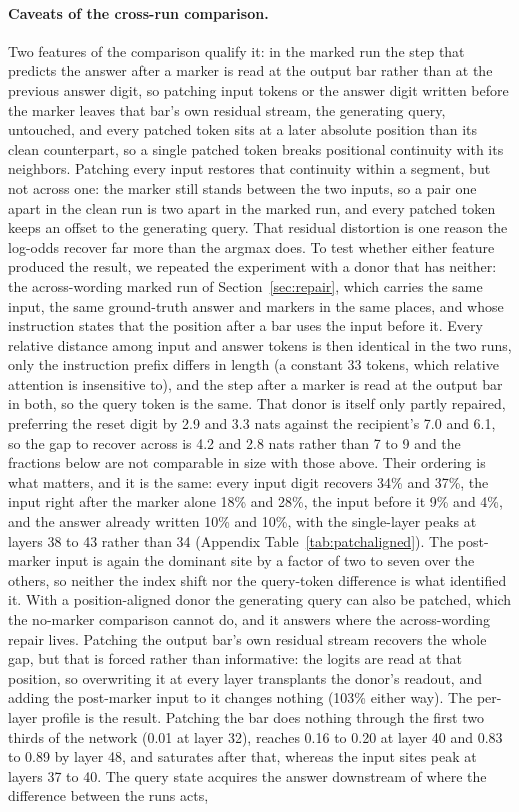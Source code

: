 \documentclass[10pt]{article} %
\begin{document}
\paragraph{Caveats of the cross-run comparison.} Two features of the comparison qualify it: in the marked run the step that predicts the answer after a marker is read at the output bar rather than at the previous answer digit, so patching input tokens or the answer digit written before the marker leaves that bar's own residual stream, the generating query, untouched, and every patched token sits at a later absolute position than its clean counterpart, so a single patched token breaks positional continuity with its neighbors. Patching every input restores that continuity within a segment, but not across one: the marker still stands between the two inputs, so a pair one apart in the clean run is two apart in the marked run, and every patched token keeps an offset to the generating query. That residual distortion is one reason the log-odds recover far more than the argmax does. To test whether either feature produced the result, we repeated the experiment with a donor that has neither: the across-wording marked run of Section~\ref{sec:repair}, which carries the same input, the same ground-truth answer and markers in the same places, and whose instruction states that the position after a bar uses the input before it. Every relative distance among input and answer tokens is then identical in the two runs, only the instruction prefix differs in length (a constant 33 tokens, which relative attention is insensitive to), and the step after a marker is read at the output bar in both, so the query token is the same. That donor is itself only partly repaired, preferring the reset digit by 2.9 and 3.3 nats against the recipient's 7.0 and 6.1, so the gap to recover across is 4.2 and 2.8 nats rather than 7 to 9 and the fractions below are not comparable in size with those above. Their ordering is what matters, and it is the same: every input digit recovers 34\% and 37\%, the input right after the marker alone 18\% and 28\%, the input before it 9\% and 4\%, and the answer already written 10\% and 10\%, with the single-layer peaks at layers 38 to 43 rather than 34 (Appendix Table~\ref{tab:patchaligned}). The post-marker input is again the dominant site by a factor of two to seven over the others, so neither the index shift nor the query-token difference is what identified it. With a position-aligned donor the generating query can also be patched, which the no-marker comparison cannot do, and it answers where the across-wording repair lives. Patching the output bar's own residual stream recovers the whole gap, but that is forced rather than informative: the logits are read at that position, so overwriting it at every layer transplants the donor's readout, and adding the post-marker input to it changes nothing (103\% either way). The per-layer profile is the result. Patching the bar does nothing through the first two thirds of the network (0.01 at layer 32), reaches 0.16 to 0.20 at layer 40 and 0.83 to 0.89 by layer 48, and saturates after that, whereas the input sites peak at layers 37 to 40. The query state acquires the answer downstream of where the difference between the runs acts, 
\end{document}
